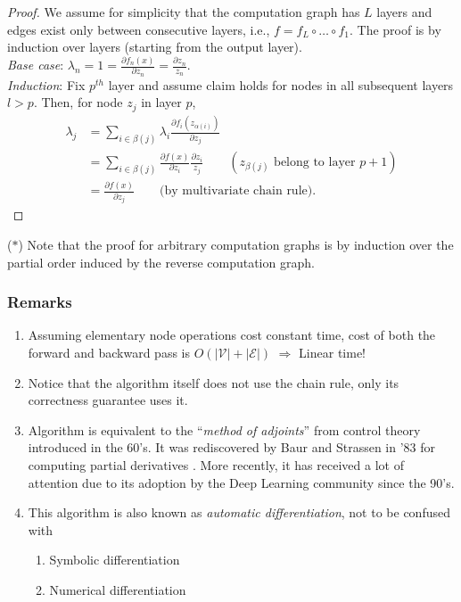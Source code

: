 \documentclass[12pt]{article}
\begin{document}
\begin{proof}
We assume for simplicity that the computation graph has $L$ layers and edges exist only between consecutive layers, i.e., $f = f_L \circ \dots \circ f_1 $. The proof is by induction over layers (starting from the output layer). \\
\medskip
\textit{Base case}: $\lambda_n = 1 = \frac{\partial f_n (x)}{\partial z_n} = \frac{\partial z_n}{z_n}$. \\
\medskip
\textit{Induction}: Fix $p^{th}$ layer and assume claim holds for nodes in all subsequent layers $l > p$.  Then, for node $z_j$ in layer $p$, 
\begin{align*}
\lambda_j &= \sum_{i \in \beta(j)} \lambda_i \frac{\partial f_i(z_{\alpha (i)})}{\partial z_j} \\
&= \sum_{i \in \beta(j)} \frac{\partial f(x)}{\partial z_i} \frac{\partial z_i}{z_j} \qquad (z_{\beta (j)} \text{ belong to layer } p+1) \\
&= \frac{\partial f(x)}{\partial z_j} \qquad \text{(by multivariate chain rule)}.
\end{align*}
\end{proof}
\noindent ($\ast$) Note that the proof for arbitrary computation graphs is by induction over the partial order induced by the reverse computation graph. 
\subsubsection*{Remarks}
\begin{enumerate}
\item Assuming elementary node operations cost constant time, cost of both the forward and backward pass is $O(|\mathcal{V}| + |\mathcal{E}|)$ $\Rightarrow$ Linear time!
\item Notice that the algorithm itself does not use the chain rule, only its correctness guarantee uses it. 
\item Algorithm is equivalent to the ``\textit{method of adjoints}'' from control theory introduced in the 60's. It was rediscovered by Baur and Strassen in '83 for computing partial derivatives \cite{baur1983complexity}. More recently, it has received a lot of attention due to its adoption by the Deep Learning community since the 90's.
\item This algorithm is also known as \textit{automatic differentiation}, not to be confused with 
\begin{enumerate}
\item Symbolic differentiation
\item Numerical differentiation
\end{enumerate}
\end{enumerate}
\end{document}
